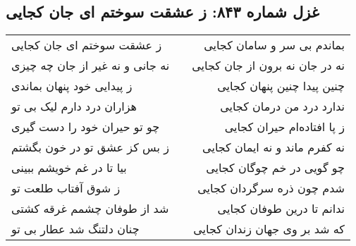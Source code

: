 \begin{center}
\section*{غزل شماره ۸۴۳: ز عشقت سوختم ای جان کجایی}
\label{sec:843}
\begin{longtable}{l p{0.5cm} r}
ز عشقت سوختم ای جان کجایی
&&
بماندم بی سر و سامان کجایی
\\
نه جانی و نه غیر از جان چه چیزی
&&
نه در جان نه برون از جان کجایی
\\
ز پیدایی خود پنهان بماندی
&&
چنین پیدا چنین پنهان کجایی
\\
هزاران درد دارم لیک بی تو
&&
ندارد درد من درمان کجایی
\\
چو تو حیران خود را دست گیری
&&
ز پا افتاده‌ام حیران کجایی
\\
ز بس کز عشق تو در خون بگشتم
&&
نه کفرم ماند و نه ایمان کجایی
\\
بیا تا در غم خویشم ببینی
&&
چو گویی در خم چوگان کجایی
\\
ز شوق آفتاب طلعت تو
&&
شدم چون ذره سرگردان کجایی
\\
شد از طوفان چشمم غرقه کشتی
&&
ندانم تا درین طوفان کجایی
\\
چنان دلتنگ شد عطار بی تو
&&
که شد بر وی جهان زندان کجایی
\\
\end{longtable}
\end{center}
